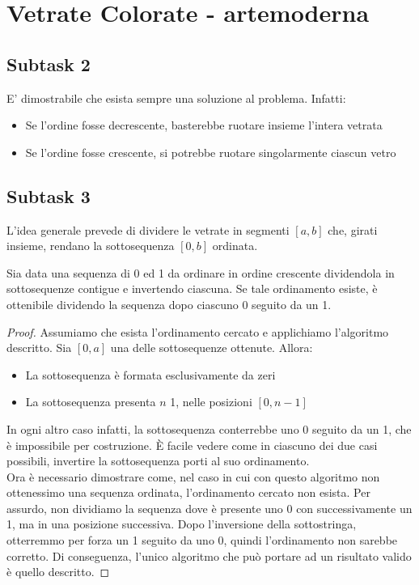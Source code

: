 \section{Vetrate Colorate - artemoderna}

\subsection*{Subtask 2}
E' dimostrabile che esista sempre una soluzione al problema.
Infatti:
\begin{itemize}
    \item Se l'ordine fosse decrescente, basterebbe ruotare insieme l'intera vetrata
    \item Se l'ordine fosse crescente, si potrebbe ruotare singolarmente ciascun vetro
\end{itemize}



\subsection*{Subtask 3}
L'idea generale prevede di dividere le vetrate in segmenti $[a, b]$ che, girati insieme, rendano la sottosequenza $[0, b]$ ordinata.
\begin{prop}
    Sia data una sequenza di 0 ed 1 da ordinare in ordine crescente dividendola in sottosequenze contigue e invertendo ciascuna.
    Se tale ordinamento esiste, è ottenibile dividendo la sequenza dopo ciascuno 0 seguito da un 1.
\end{prop}
\begin{proof}
    Assumiamo che esista l'ordinamento cercato e applichiamo l'algoritmo descritto. Sia $[0, a]$ una delle sottosequenze ottenute.
    Allora:
    \begin{itemize}
        \item La sottosequenza è formata esclusivamente da zeri
        \item La sottosequenza presenta $n$ 1, nelle posizioni $[0, n-1]$
    \end{itemize}
    In ogni altro caso infatti, la sottosequenza conterrebbe uno 0 seguito da un 1, che è impossibile per costruzione.
    È facile vedere come in ciascuno dei due casi possibili, invertire la sottosequenza porti al suo ordinamento. \\
    Ora è necessario dimostrare come, nel caso in cui con questo algoritmo non ottenessimo una sequenza ordinata, l'ordinamento cercato non esista.
    Per assurdo, non dividiamo la sequenza dove è presente uno 0 con successivamente un 1, ma in una posizione successiva.
    Dopo l'inversione della sottostringa, otterremmo per forza un 1 seguito da uno 0, quindi l'ordinamento non sarebbe corretto. 
    Di conseguenza, l'unico algoritmo che può portare ad un risultato valido è quello descritto.
\end{proof}

